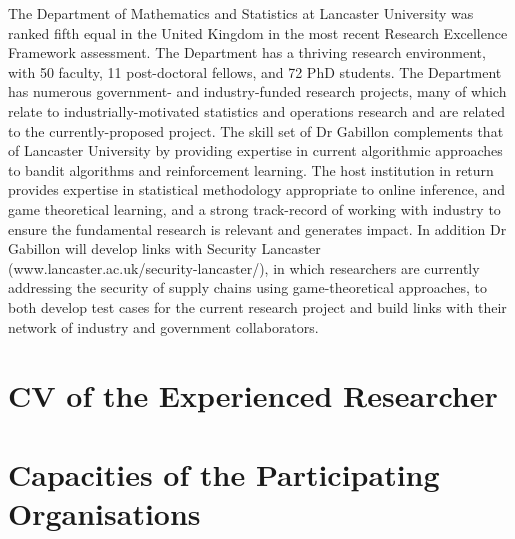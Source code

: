 \documentclass[a4paper,11pt]{article}
\begin{document}
The Department of Mathematics and Statistics at Lancaster University was ranked fifth equal in the United Kingdom in the most recent Research Excellence Framework assessment.  The Department has a thriving research environment, with 50 faculty, 11 post-doctoral fellows, and 72 PhD students.  The Department has numerous government- and industry-funded research projects, many of which relate to industrially-motivated statistics and operations research and are related to the currently-proposed project.  The skill set of Dr Gabillon complements that of Lancaster University by providing expertise in current algorithmic approaches to bandit algorithms and reinforcement learning.  The host institution in return provides expertise in statistical methodology appropriate to online inference, and game theoretical learning, and a strong track-record of working with industry to ensure the fundamental research is relevant and generates impact.  In addition Dr Gabillon will develop links with Security Lancaster (www.lancaster.ac.uk/security-lancaster/), in which researchers are currently addressing the security of supply chains using game-theoretical approaches, to both develop test cases for the current research project and build links with their network of industry and government collaborators.

\newpage
\section{CV of the Experienced Researcher}
\label{sec:cv}



\newpage
\section{Capacities of the Participating Organisations}
\label{sec:capacities}

\vspace{\baselineskip}
\end{document}
